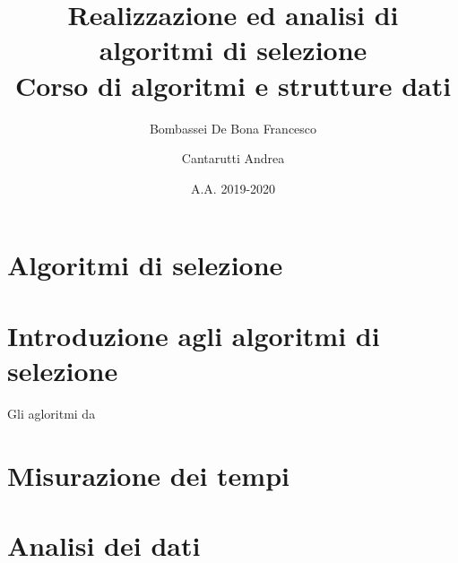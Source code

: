 \documentclass[11pt]{report}
\author{Bombassei De Bona Francesco \and Cantarutti Andrea}
\title{\LARGE Realizzazione ed analisi di algoritmi di selezione \\ \normalsize Corso di algoritmi e strutture dati}
\date{A.A. 2019-2020}
\begin{document}
\maketitle
\tableofcontents
\part{Algoritmi di selezione}
\part{Introduzione agli algoritmi di selezione}
Gli agloritmi da
\part{Misurazione dei tempi}
\part{Analisi dei dati}
\end{document}
